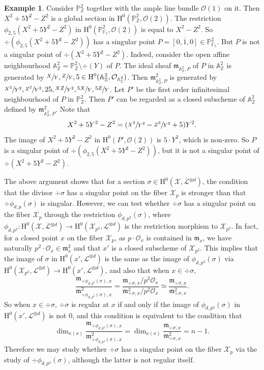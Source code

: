 \documentclass[JEP,XML,SOM,Unicode,published]{cedram}
\theoremstyle{plain}
\theoremstyle{definition}
\newtheorem*{expl}{Example}
\newcommand{\ho}{\mathrm{H}}
\newcommand{\m}{\mathfrak{m}}
\newcommand{\X}{\mathcal{X}}
\newcommand{\Li}{\overline{\mathcal{L}}{}}
\newcommand{\li}{\mathcal{L}}
\newcommand{\A}{\mathbb{A}}
\newcommand{\Z}{\mathbb{Z}}
\newcommand{\pr}{\mathbb{P}}
\newcommand{\F}{\mathbb{F}}
\begin{document}
\begin{expl}
Consider $\pr^2_{\Z}$ together with the ample line bundle $\mathcal{O}(1)$ on it. Then $X^2+5Y^2-Z^2$ is a global section in $\ho^0(\pr^2_{\Z}, \mathcal{O}(2))$. The restriction $\phi_{2,5}(X^2+5Y^2-Z^2)$ in $\ho^0(\pr^2_{\F_5}, \mathcal{O}(2))$ is equal to $X^2-Z^2$. So $\div (\phi_{2,5}(X^2+5Y^2-Z^2))$ has a singular point $P=\overline{[0,1,0]}\in \pr^2_{\F_5}$. But $P$ is not a singular point of $\div (X^2+5Y^2-Z^2)$. Indeed, consider the open affine neighbourhood $\A^2_{\Z}=\pr^2_{\Z}\setminus\div (Y)$ of $P$. The ideal sheaf $\mathfrak{m}_{\A^2_{\Z},P}$ of $P$ in $\A^2_{\Z}$ is generated by $\sfrac{X}{Y},\sfrac{Z}{Y},5\in \ho^0(\A^2_{\Z}, \mathcal{O}_{\A^2_{\Z}})$. Then $\mathfrak{m}^2_{\A^2_{\Z},P}$ is generated by $\sfrac{X^2}{Y^2}, \sfrac{Z^2}{Y^2}, 25, \sfrac{XZ}{Y^2}, \sfrac{5X}{Y},\sfrac{5Z}{Y}$. Let $P'$ be the first order infinitesimal neighbourhood of $P$ in $\pr^2_{\Z}$. Then $P'$ can be regarded as a closed subscheme of $\A^2_{\Z}$ defined by $\mathfrak{m}^2_{\A^2_{\Z},P}$. Note that
\begin{align*}
X^2+5Y^2-Z^2 = (\sfrac{X^2}{Y^2}-\sfrac{Z^2}{Y^2}+5)Y^2.
\end{align*}
The image of $X^2+5Y^2-Z^2$ in $\ho^0(P', \mathcal{O}(2))$ is $5\cdot Y^2$, which is non-zero. So $P$ is a singular point of $\div (\phi_{2,5}(X^2+5Y^2-Z^2))$, but it is not a singular point of $\div (X^2+5Y^2-Z^2)$.
\end{expl}

The above argument shows that for a section $\sigma \in \ho^0(\X,\Li^{\otimes d})$, the condition that the divisor $\div \sigma$ has a singular point on the fiber $\X_p$ is stronger than that $\div \phi_{d,p}(\sigma)$ is singular. However, we can test whether $\div \sigma$ has a singular point on the fiber $\X_p$ through the restriction $\phi_{d,p^2}(\sigma)$, where $\phi_{d,p^2}: \ho^0(\X, \Li^{\otimes d})\to \ho^0(\X_{p^2}, \li^{\otimes d})$ is the restriction morphism to $\X_{p^2}$. In fact, for a closed point $x$ on the fiber $\X_p$, as $p\cdot\mathcal{O}_x$ is contained in $\mathfrak{m}_x$, we have naturally $p^2\cdot\mathcal{O}_x\in \mathfrak{m}^2_x$ and that $x'$ is a closed subscheme of $\X_{p^2}$. This implies that the image of $\sigma$ in $\ho^0(x', \li^{\otimes d})$ is the same as the image of $\phi_{d,p^2}(\sigma)$ via $\ho^0(\X_{p^2}, \li^{\otimes d})\to \ho^0(x', \li^{\otimes d})$, and also that when $x\in \div \sigma$,
\[
\frac{\m_{\div \phi_{d,p^2}(\sigma),x}}{\m^2_{\div \phi_{d,p^2}(\sigma), x}}=\frac{\m_{\div \sigma,x}/p^2\mathcal{O}_x}{\m^2_{\div \sigma, x}/p^2\mathcal{O}_x}\simeq\frac{\m_{\div \sigma,x}}{\m^2_{\div \sigma, x}}.
\]
So when $x\in\div \sigma$, $\div \sigma$ is regular at $x$ if and only if the image of $\phi_{d,p^2}(\sigma)$ in $\ho^0(x', \li^{\otimes d})$ is not $0$, and this condition is equivalent to the condition that
\[
\dim_{\kappa(x)}\frac{\m_{\div \phi_{d,p^2}(\sigma),x}}{\m^2_{\div \phi_{d,p^2}(\sigma), x}}=\dim_{\kappa(x)}\frac{\m_{\div \sigma,x}}{\m^2_{\div \sigma, x}}=n-1.
\]
Therefore we may study whether $\div \sigma$ has a singular point on the fiber $\X_p$ via the study of $\div \phi_{d,p^2}(\sigma)$, although the latter is not regular itself.
\end{document}
